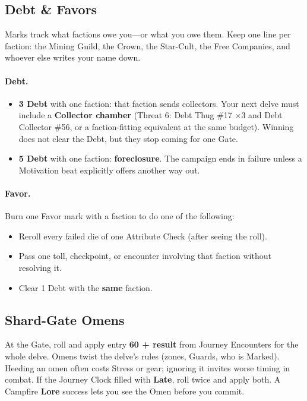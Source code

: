 \subsection{Debt \& Favors}
Marks track what factions owe you---or what you owe them. Keep one line per faction: the Mining Guild, the Crown, the Star-Cult, the Free Companies, and whoever else writes your name down.

\paragraph{Debt.}
\begin{itemize}
    \item \textbf{3 Debt} with one faction: that faction sends collectors. Your next delve must include a \textbf{Collector chamber} (Threat 6: Debt Thug \#17 $\times$3 and Debt Collector \#56, or a faction-fitting equivalent at the same budget). Winning does not clear the Debt, but they stop coming for one Gate.
    \item \textbf{5 Debt} with one faction: \textbf{foreclosure}. The campaign ends in failure unless a Motivation beat explicitly offers another way out.
\end{itemize}

\paragraph{Favor.}
Burn one Favor mark with a faction to do one of the following:
\begin{itemize}
    \item Reroll every failed die of one Attribute Check (after seeing the roll).
    \item Pass one toll, checkpoint, or encounter involving that faction without resolving it.
    \item Clear 1 Debt with the \textbf{same} faction.
\end{itemize}

\subsection{Shard-Gate Omens}
At the Gate, roll  and apply entry \textbf{60 + result} from Journey Encounters for the whole delve. Omens twist the delve's rules (zones, Guards, who is Marked). Heeding an omen often costs Stress or gear; ignoring it invites worse timing in combat.
If the Journey Clock filled with \textbf{Late}, roll twice and apply both. A Campfire \textbf{Lore} success lets you see the Omen before you commit.

